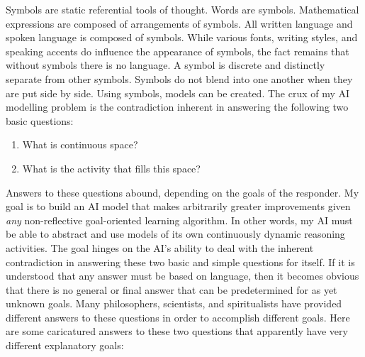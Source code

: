 Symbols are static referential tools of thought.  Words are symbols.
Mathematical expressions are composed of arrangements of symbols.  All
written language and spoken language is composed of symbols.  While
various fonts, writing styles, and speaking accents do influence the
appearance of symbols, the fact remains that without symbols there is
no language.  A symbol is discrete and distinctly separate from other
symbols.  Symbols do not blend into one another when they are put side
by side.  Using symbols, models can be created.  The crux of my AI
modelling problem is the contradiction inherent in answering the
following two basic questions:
\begin{enumerate}
\item What is continuous space?
\item What is the activity that fills this space?
\end{enumerate}
Answers to these questions abound, depending on the goals of the
responder.  My goal is to build an AI model that makes arbitrarily
greater improvements given \emph{any} non-reflective goal-oriented
learning algorithm.  In other words, my AI must be able to abstract
and use models of its own continuously dynamic reasoning activities.
The goal hinges on the AI's ability to deal with the inherent
contradiction in answering these two basic and simple questions for
itself.  If it is understood that any answer must be based on
language, then it becomes obvious that there is no general or final
answer that can be predetermined for as yet unknown goals.  Many
philosophers, scientists, and spiritualists have provided different
answers to these questions in order to accomplish different goals.
Here are some caricatured answers to these two questions that
apparently have very different explanatory goals:
